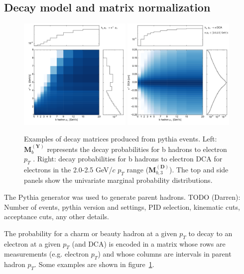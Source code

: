 \documentclass[12pt]{article}
\newcommand{\pt}{p_T}
\begin{document}
\subsection{Decay model and matrix normalization}
\begin{figure}[htb]
  \begin{center}
    \includegraphics[width=0.48\textwidth]{eptmat_b}
    \quad
    \includegraphics[width=0.48\textwidth]{dcamat_b_2}
  \end{center}
  \caption{Examples of decay matrices produced from pythia events. Left: $\mathbf{M}_{b}^{\mathbf{(Y)}}$ represents the decay probabilities for b hadrons to electron $\pt$ . Right: decay probabilities for b hadrons to electron DCA for electrons in the 2.0-2.5 GeV/$c$ $\pt$ range ($\mathbf{M}_{b,3}^{\mathbf{(D)}}$). The top and side panels show the univariate marginal probability distributions.}
  \label{fig:mat}
\end{figure}

The Pythia generator was used to generate parent hadrons. TODO (Darren): Number of events, pythia version and settings, PID selection, kinematic cuts, acceptance cuts, any other details.

The probability for a charm or beauty hadron at a given $\pt$ to decay to an electron at a given $\pt$ (and DCA) is encoded in a matrix whose rows are measurements (e.g. electron $\pt$) and whose columns are intervals in parent hadron $\pt$. Some examples are shown in figure~\ref{fig:mat}.
\end{document}
